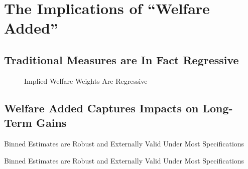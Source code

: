 \documentclass[letterpaper,12pt]{article}
\begin{document}



\section{The Implications of ``Welfare Added''}

\subsection{Traditional Measures are In Fact Regressive}


\begin{figure}
    \centering
    \caption{Implied Welfare Weights Are Regressive}
    \label{fig:my_label}
\end{figure}







\subsection{Welfare Added Captures Impacts on Long-Term Gains}


\begin{table}[]
    \centering
    
    \caption{Binned Estimates are Robust and Externally Valid Under Most Specifications}
    \label{tab:my_label}
\end{table}

\begin{table}[]
    \centering
    
    \caption{Binned Estimates are Robust and Externally Valid Under Most Specifications}
    \label{tab:my_label}
\end{table}
\end{document}
